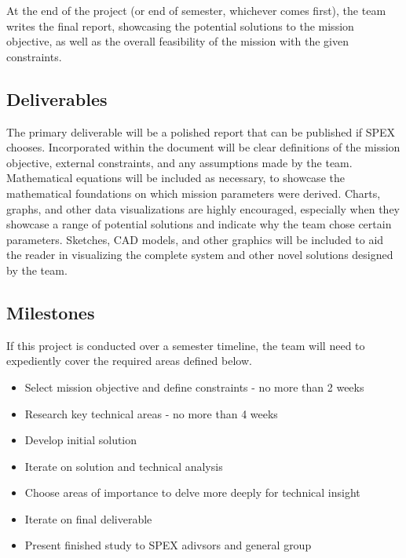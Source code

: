 \documentclass[conference]{IEEEtran} %
\begin{document}
At the end of the project (or end of semester, whichever comes first), the team writes the final report, showcasing the potential solutions to the mission objective, as well as the overall feasibility of the mission with the given constraints.

\subsection{Deliverables}
\label{subsec:deliverables}
The primary deliverable will be a polished report that can be published if SPEX chooses.
Incorporated within the document will be clear definitions of the mission objective, external constraints, and any assumptions made by the team.
Mathematical equations will be included as necessary, to showcase the mathematical foundations on which mission parameters were derived.
Charts, graphs, and other data visualizations are highly encouraged, especially when they showcase a range of potential solutions and indicate why the team chose certain parameters.
Sketches, CAD models, and other graphics will be included to aid the reader in visualizing the complete system and other novel solutions designed by the team.
\subsection{Milestones}
\label{subsec:milestones}
If this project is conducted over a semester timeline, the team will need to expediently cover the required areas defined below.
\begin{itemize}
  \item Select mission objective and define constraints - no more than 2 weeks
  \item Research key technical areas - no more than 4 weeks
  \item Develop initial solution
  \item Iterate on solution and technical analysis
  \item Choose areas of importance to delve more deeply for technical insight
  \item Iterate on final deliverable
  \item Present finished study to SPEX adivsors and general group
\end{itemize}
\end{document}

